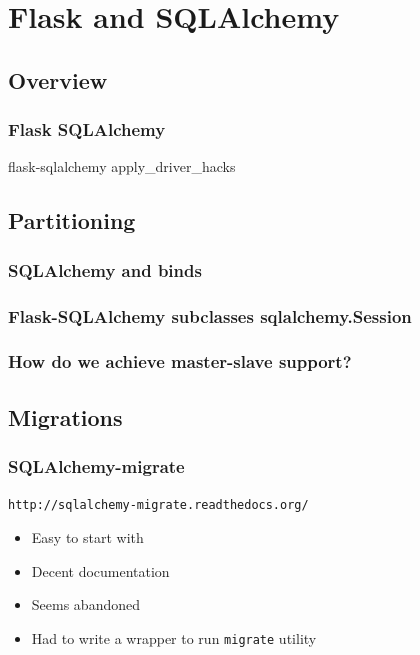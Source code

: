 \documentclass{beamer}
\begin{document}
\section{Flask and SQLAlchemy}

\subsection{Overview}

\begin{frame}
  \frametitle{Flask SQLAlchemy}
  flask-sqlalchemy
  apply\_driver\_hacks
\end{frame}

\subsection{Partitioning}

\begin{frame}
  \frametitle{SQLAlchemy and binds}
\end{frame}

\begin{frame}
  \frametitle{Flask-SQLAlchemy subclasses sqlalchemy.Session}
  
\end{frame}

\begin{frame}
  \frametitle{How do we achieve master-slave support?}
\end{frame}

\subsection{Migrations}

\begin{frame}
  \frametitle{SQLAlchemy-migrate}
  \texttt{http://sqlalchemy-migrate.readthedocs.org/}
  \begin{itemize}
  \item Easy to start with
  \item Decent documentation
  \item Seems abandoned
  \item Had to write a wrapper to run \texttt{migrate} utility
  \end{itemize}
\end{frame}
\end{document}
